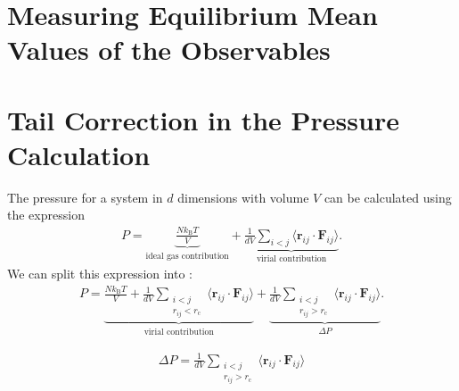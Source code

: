 \documentclass[a4paper,10pt,bibtotoc]{scrartcl}
\begin{document}
\section{Measuring Equilibrium Mean Values of the Observables}
\section{Tail Correction in the Pressure Calculation}
The pressure for a system in $d$ dimensions with volume $V$ can be calculated using the expression
\begin{align}
P = \underbrace{\frac{Nk_\mathrm{B}T}{V}}_{\text{ideal gas contribution}} + \underbrace{\frac{1}{dV}\sum_{i<j}\langle\mathbf{r}_{ij}\cdot\mathbf{F}_{ij}\rangle}_{\text{virial contribution}}.
\end{align}
We can split this expression into :
\begin{align}
P = \underbrace{\frac{Nk_\mathrm{B}T}{V} + \frac{1}{dV}\sum_{\substack{i<j\\ r_{ij}<r_\mathrm{c}}}\langle\mathbf{r}_{ij}\cdot\mathbf{F}_{ij}\rangle}_{\text{virial contribution}} + \underbrace{\frac{1}{dV}\sum_{\substack{i<j\\ r_{ij}>r_\mathrm{c}}}\langle\mathbf{r}_{ij}\cdot\mathbf{F}_{ij}\rangle}_{\Delta P}.
\end{align}

\begin{align}
\Delta P = \frac{1}{dV}\sum_{\substack{i<j\\ r_{ij}>r_\mathrm{c}}}\langle\mathbf{r}_{ij}\cdot\mathbf{F}_{ij}\rangle
\end{align}
\end{document}

